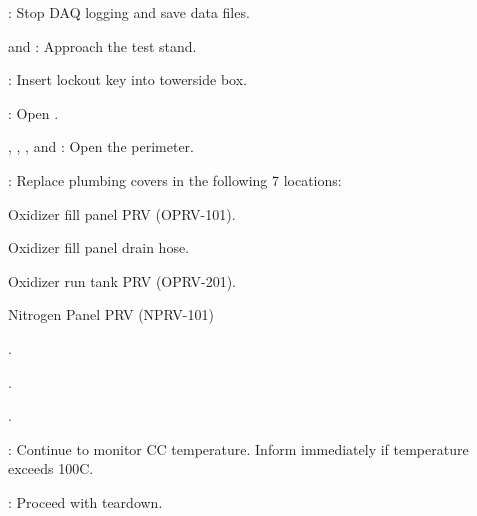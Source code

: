 \begin{checklist}
    \item \daq{}: Stop DAQ logging and save data files. 
    \item \primary{} and \secondary{}: Approach the test stand. 
    \item \secondary{}: Insert lockout key into towerside box. 
    \item \primary{}: Open \pdrain{}.
    \item \peri{}, \perii{}, \periii{}, and \periv{}: Open the perimeter. 
    \item \primary{}: Replace plumbing covers in the following 7 locations:
    \begin{checklist}
        \item Oxidizer fill panel PRV (OPRV-101).
        \item Oxidizer fill panel drain hose.
        \item Oxidizer run tank PRV (OPRV-201).
        \item Nitrogen Panel PRV (NPRV-101)
        \item \vent{}.
        \item \fdrain{}.
        \item \pdrain{}.
    \end{checklist}
    \item \daq{}: Continue to monitor CC temperature. Inform \ops{} immediately if temperature exceeds 100\textdegree C. 
    \item \ops{}: Proceed with teardown. 
\end{checklist}
    
\newpage
